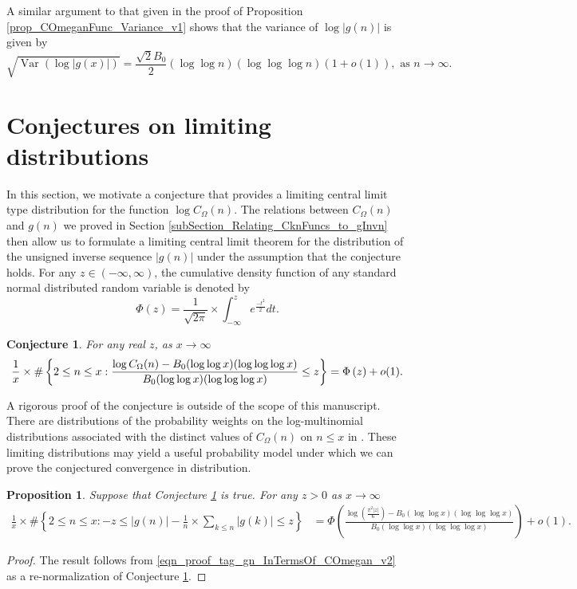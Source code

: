 \documentclass[11pt,reqno,a4letter]{article}
\newcommand{\hlocalref}[1]{\hyperref[#1]{\ref{#1}}}
\numberwithin{equation}{section}
\numberwithin{figure}{section}
\numberwithin{table}{section}
\let\citep\cite
\newcommand{\cf}{\textit{cf.\ }}
\theoremstyle{plain}
\newtheorem{conjecture}[theorem]{Conjecture}
\newtheorem{prop}[theorem]{Proposition}
\numberwithin{theorem}{section}
\theoremstyle{definition}
\begin{document}
A similar argument to that given in the proof of 
Proposition \hlocalref{prop_COmeganFunc_Variance_v1} 
shows that the variance of $\log |g(n)|$ is given by 
\[
\sqrt{\operatorname{Var}\left(\log |g(x)|\right)}= 
     \frac{\sqrt{2} B_0}{2} (\log\log n) (\log\log\log n) (1+o(1)), 
     \text{ as } n \rightarrow \infty. 
\]

\section{Conjectures on limiting distributions} 
\label{subSection_ErdosKacTheorem_Analogs} 

In this section, we motivate a conjecture that provides a limiting 
central limit type distribution for the function $\log C_{\Omega}(n)$. 
The relations between $C_{\Omega}(n)$ and $g(n)$ we proved in 
Section \hlocalref{subSection_Relating_CknFuncs_to_gInvn} then 
allow us to formulate a limiting central limit theorem for the distribution 
of the unsigned inverse sequence $|g(n)|$ under the assumption that 
the conjecture holds. For any $z \in (-\infty, \infty)$, 
the cumulative density function of any standard normal distributed random variable is 
denoted by 
$$\Phi(z) = \frac{1}{\sqrt{2\pi}} \times \int_{-\infty}^{z} e^{\frac{-t^2}{2}} dt.$$ 

\begin{conjecture}
\label{conj_DetFormOfEKTypeThmForCOmegan_v1} 
For any real $z$, as $x \rightarrow \infty$ 
\begin{equation} 
\notag
\frac{1}{x} \times \#\left\{2 \leq n \leq x: 
	\frac{\log C_{\Omega}(n) - 
	B_0 (\log\log x) (\log\log\log x)}{B_0 (\log\log x)(\log\log\log x)} \leq z\right\} = 
     \Phi\left(z\right) + o(1). 
\end{equation}
\end{conjecture} 

A rigorous proof of the conjecture is outside of the scope of this manuscript. 
There are distributions of the probability weights on the 
log-multinomial distributions associated 
with the distinct values of $C_{\Omega}(n)$ on $n \leq x$ 
in \citep[\cf \S 1.2]{LOG-COMB-STRUCTS-BOOK}. 
These limiting distributions may yield a useful probability 
model under which we can prove the conjectured convergence in distribution.

\begin{prop}
\label{cor_CLT_VII} 
Suppose that Conjecture \hlocalref{conj_DetFormOfEKTypeThmForCOmegan_v1} is true. 
For any $z > 0$ as $x \rightarrow \infty$ 
\begin{align*} 
\frac{1}{x} \times \#\left\{2 \leq n \leq x: -z \leq |g(n)| - 
     \frac{1}{n} \times \sum_{k \leq n} |g(k)| \leq z\right\} & = 
	\Phi\left(\frac{\log\left(\frac{\pi^2 |z|}{6}\right) - B_0 (\log\log x) (\log\log\log x)}{ 
	B_0 (\log\log x)(\log\log\log x)}\right) + o(1).
\end{align*} 
\end{prop} 
\begin{proof} 
The result follows from \eqref{eqn_proof_tag_gn_InTermsOf_COmegan_v2} 
as a re-normalization of Conjecture \hlocalref{conj_DetFormOfEKTypeThmForCOmegan_v1}. 
\end{proof} 
\end{document}
